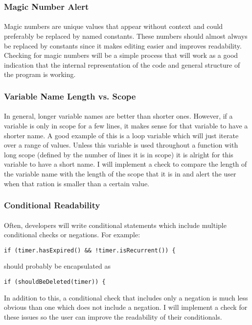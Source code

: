 \documentclass{article}
\begin{document}
\subsubsection{Magic Number Alert}
\paragraph{} 
Magic numbers are unique values that appear without context and could preferably be replaced by named constants. These numbers should almost always be replaced by constants since it makes editing easier and improves readability. Checking for magic numbers will be a simple process that will work as a good indication that the internal representation of the code and general structure of the program is working.

\subsubsection{Variable Name Length vs. Scope}
\paragraph{}
In general, longer variable names are better than shorter ones. However, if a variable is only in scope for a few lines, it makes sense for that variable to have a shorter name. A good example of this is a loop variable which will just iterate over a range of values. Unless this variable is used throughout a function with long scope (defined by the number of lines it is in scope) it is alright for this variable to have a short name. I will implement a check to compare the length of the variable name with the length of the scope that it is in and alert the user when that ration is smaller than a certain value.

\subsubsection{Conditional Readability}
\paragraph{} 
Often, developers will write conditional statements which include multiple conditional checks or negations. For example:
\begin{verbatim}if (timer.hasExpired() && !timer.isRecurrent()) {
\end{verbatim}
should probably be encapsulated as
\begin{verbatim}
if (shouldBeDeleted(timer)) {
\end{verbatim}
In addition to this, a conditional check that includes only a negation is much less obvious than one which does not include a negation. I will implement a check for these issues so the user can improve the readability of their conditionals.
\end{document}
